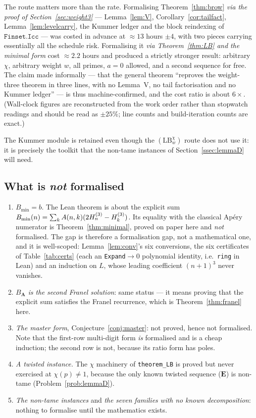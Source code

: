 The route matters more than the rate. Formalising Theorem~\ref{thm:brow} \emph{via the
proof of Section~\ref{sec:weight3}} --- Lemma~\ref{lem:V}, Corollary~\ref{cor:tailfact},
Lemma~\ref{lem:levelcarry}, the Kummer ledger and the block reindexing of
$\texttt{Finset.Icc}$ --- was costed in advance at $\approx13$ hours $\pm4$, with two
pieces carrying essentially all the schedule risk. Formalising it \emph{via
Theorem~\ref{thm:LB} and the minimal form} cost $\approx2.2$ hours and produced a strictly
stronger result: arbitrary $\chi$, arbitrary weight $w$, all primes, $a=0$ allowed, and a
second sequence for free. The claim made informally --- that the general theorem
``reproves the weight-three theorem in three lines, with no Lemma~V, no tail
factorisation and no Kummer ledger'' --- is thus machine-confirmed, and the cost ratio is
about $6\times$. (Wall-clock figures are reconstructed from the work order rather than
stopwatch readings and should be read as $\pm25\%$; line counts and build-iteration counts
are exact.)

The Kummer module is retained even though the $(\mathrm{LB}_w^\chi)$ route does not use
it: it is precisely the toolkit that the non-tame instances of
Section~\ref{ssec:lemmaD} will need.

\subsection{What is \emph{not} formalised}

\begin{enumerate}[leftmargin=1.7em]
\item \emph{$B_{\min}=b$}. The Lean theorem is about the explicit sum
  $B_{\min}(n)=\sum_kA(n,k)(2H^{(3)}_{n}-H^{(3)}_{k})$. Its equality with the classical Ap\'ery
  numerator is Theorem~\ref{thm:minimal}, proved on paper here and \emph{not} formalised.
  The gap is therefore a formalisation gap, not a mathematical one, and it is well-scoped:
  Lemma~\ref{lem:conv}'s six conversions, the six certificates of Table~\ref{tab:certs}
  (each an \texttt{Expand}$\to0$ polynomial identity, i.e.\ \texttt{ring} in Lean) and an
  induction on $L$, whose leading coefficient $(n+1)^3$ never vanishes.
\item \emph{$B_{\mathbf A}$ is the second Franel solution}: same status --- it means
  proving that the explicit sum satisfies the Franel recurrence, which is
  Theorem~\ref{thm:franel} here.
\item \emph{The master form}, Conjecture~\ref{conj:master}: not proved, hence not
  formalised. Note that the first-row multi-digit form \emph{is} formalised and is a cheap
  induction; the second row is not, because its ratio form has poles.
\item \emph{A twisted instance.} The $\chi$ machinery of \texttt{theorem\_LB} is proved
  but never exercised at $\chi(p)\ne1$, because the only known twisted sequence
  ($\mathbf E$) is non-tame (Problem~\ref{prob:lemmaD}).
\item \emph{The non-tame instances} and \emph{the seven families with no known
  decomposition}: nothing to formalise until the mathematics exists.
\end{enumerate}
